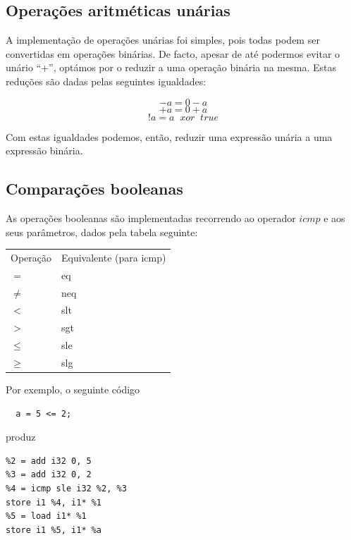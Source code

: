 \documentclass[11pt,a4paper]{article}
\begin{document}
\subsection{Operações aritméticas unárias}

A implementação de operações unárias foi simples, pois todas podem ser convertidas em operações binárias. De facto, apesar de até podermos evitar o unário ``+'', optámos por o reduzir a uma operação binária na mesma. Estas reduções são dadas pelas seguintes igualdades:

$$
-a = 0 - a
$$
$$
+a = 0 + a
$$
$$
!a = a\;\; xor\;\; true
$$

Com estas igualdades podemos, então, reduzir uma expressão unária a uma expressão binária.

\subsection{Comparações booleanas}

As operações booleanas são implementadas recorrendo ao operador $icmp$ e aos seus parâmetros, dados pela tabela seguinte:

\pagebreak

\begin{table}
    \begin{tabular}{ll}
    Operação      & Equivalente (para icmp) \\
    $=$             & eq                      \\
    $\neq$ & neq                     \\
    $<$             & slt                     \\
    $>$             & sgt                     \\
    $\leq$ & sle                     \\
        $\geq$ & slg                     \\
    \end{tabular}
\end{table}

Por exemplo, o seguinte código

\begin{lstlisting}
  a = 5 <= 2;
\end{lstlisting}

produz

\begin{lstlisting}
%2 = add i32 0, 5
%3 = add i32 0, 2
%4 = icmp sle i32 %2, %3
store i1 %4, i1* %1
%5 = load i1* %1
store i1 %5, i1* %a
  
\end{lstlisting}
\end{document}
